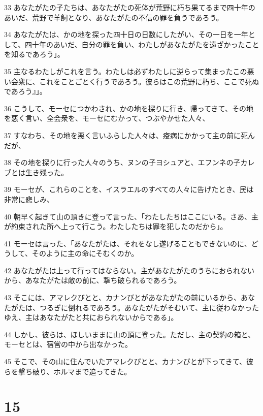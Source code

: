 \par 33 あなたがたの子たちは、あなたがたの死体が荒野に朽ち果てるまで四十年のあいだ、荒野で羊飼となり、あなたがたの不信の罪を負うであろう。
\par 34 あなたがたは、かの地を探った四十日の日数にしたがい、その一日を一年として、四十年のあいだ、自分の罪を負い、わたしがあなたがたを遠ざかったことを知るであろう」。
\par 35 主なるわたしがこれを言う。わたしは必ずわたしに逆らって集まったこの悪い会衆に、これをことごとく行うであろう。彼らはこの荒野に朽ち、ここで死ぬであろう』」。
\par 36 こうして、モーセにつかわされ、かの地を探りに行き、帰ってきて、その地を悪く言い、全会衆を、モーセにむかって、つぶやかせた人々、
\par 37 すなわち、その地を悪く言いふらした人々は、疫病にかかって主の前に死んだが、
\par 38 その地を探りに行った人々のうち、ヌンの子ヨシュアと、エフンネの子カレブとは生き残った。
\par 39 モーセが、これらのことを、イスラエルのすべての人々に告げたとき、民は非常に悲しみ、
\par 40 朝早く起きて山の頂きに登って言った、「わたしたちはここにいる。さあ、主が約束された所へ上って行こう。わたしたちは罪を犯したのだから」。
\par 41 モーセは言った、「あなたがたは、それをなし遂げることもできないのに、どうして、そのように主の命にそむくのか。
\par 42 あなたがたは上って行ってはならない。主があなたがたのうちにおられないから、あなたがたは敵の前に、撃ち破られるであろう。
\par 43 そこには、アマレクびとと、カナンびとがあなたがたの前にいるから、あなたがたは、つるぎに倒れるであろう。あなたがたがそむいて、主に従わなかったゆえ、主はあなたがたと共におられないからである」。
\par 44 しかし、彼らは、ほしいままに山の頂に登った。ただし、主の契約の箱と、モーセとは、宿営の中から出なかった。
\par 45 そこで、その山に住んでいたアマレクびとと、カナンびとが下ってきて、彼らを撃ち破り、ホルマまで追ってきた。

\chapter{15}

